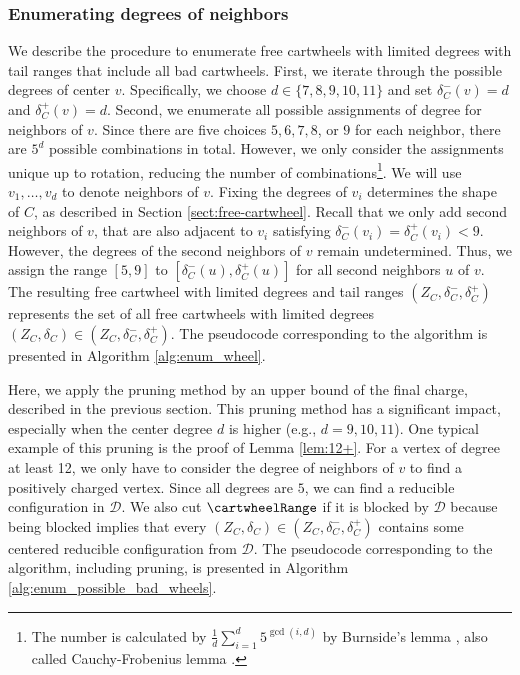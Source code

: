\documentclass[10pt,a4paper]{article}
\begin{document}
\subsubsection{Enumerating degrees of neighbors}
\label{subsub:enum-degree-neighbor}
We describe the procedure to enumerate free cartwheels with limited degrees with tail ranges that include all bad cartwheels.
First, we iterate through the possible degrees of center $v$.
Specifically, we choose $d \in \{7,8,9,10,11\}$ and set $\delta_C^-(v)=d$ and $\delta_C^+(v)=d$.
Second, we enumerate all possible assignments of degree for neighbors of $v$.
Since there are five choices $5,6,7,8$, or $9$ for each neighbor, there are $5^{d}$ possible combinations in total.
However, we only consider the assignments unique up to rotation, reducing the number of combinations\footnote{The number is calculated by $\frac{1}{d}\sum_{i=1}^d 5^{\gcd(i,d)}$ by Burnside's lemma \cite{burnside1909theory}, also called Cauchy-Frobenius lemma \cite{frobenius}.}.
We will use $v_1, \ldots, v_{d}$ to denote neighbors of $v$.
Fixing the degrees of $v_i$ determines the shape of $C$, as described in Section \ref{sect:free-cartwheel}.
Recall that we only add second neighbors of $v$, that are also adjacent to $v_i$ satisfying $\delta_C^-(v_i)=\delta_C^+(v_i) < 9$.
However, the degrees of the second neighbors of $v$ remain undetermined.
Thus, we assign the range $[5, 9]$ to $[\delta_C^-(u),\delta_C^+(u)]$ for all second neighbors $u$ of $v$.
The resulting free cartwheel with limited degrees and tail ranges $(Z_C, \delta_C^-, \delta_C^+)$ represents the set of all free cartwheels with limited degrees $(Z_C, \delta_C) \in (Z_C, \delta_C^-, \delta_C^+)$.
The pseudocode corresponding to the algorithm is presented in Algorithm \ref{alg:enum_wheel}.

Here, we apply the pruning method by an upper bound of the final charge, described in the previous section.
This pruning method has a significant impact, especially when the center degree $d$ is higher (e.g., $d=9,10,11$).
One typical example of this pruning is the proof of Lemma \ref{lem:12+}.
For a vertex of degree at least 12, we only have to consider the degree of neighbors of $v$
to find a positively charged vertex.
Since all degrees are $5$, we can find a reducible configuration in $\mathcal{D}$.
We also cut $\cartwheelRange$ if it is blocked by $\mathcal{D}$ because being blocked implies that every $(Z_C, \delta_C) \in (Z_C, \delta_C^-, \delta_C^+)$ contains some centered reducible configuration from $\mathcal{D}$.
The pseudocode corresponding to the algorithm, including pruning, is presented in Algorithm \ref{alg:enum_possible_bad_wheels}.
\end{document}
